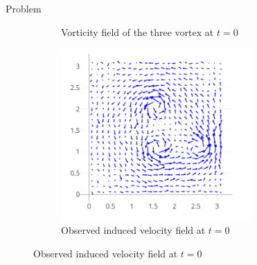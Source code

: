 \documentclass[aspectratio=169]{beamer} %
\begin{document}
\begin{frame}{Problem}
\begin{figure}
\begin{subfigure}[t]{0.32\textwidth}
            \caption*{\tiny Vorticity field of the three vortex at $t=0$}
        \end{subfigure}
        \begin{subfigure}[t]{0.32\textwidth}
            \centering
            \includegraphics[width=0.8\textwidth]{images/obs_velocity.png}
            \caption*{\tiny Observed induced velocity field at $t=0$}
        \end{subfigure}
    \end{figure}

\end{frame}
\end{document}
